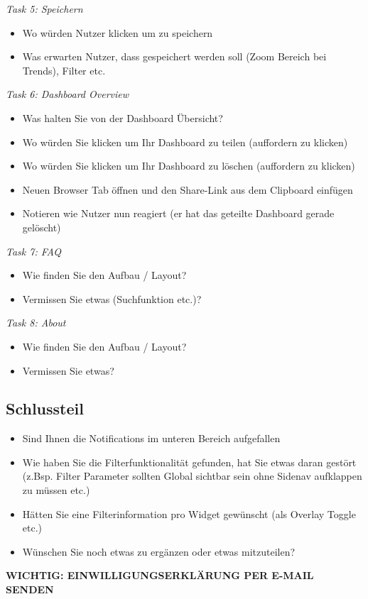 \textit{Task 5: Speichern}
\begin{itemize}
\item Wo würden Nutzer klicken um zu speichern
\item Was erwarten Nutzer, dass gespeichert werden soll (Zoom Bereich bei Trends), Filter etc.
\end{itemize}

\textit{Task 6: Dashboard Overview}
\begin{itemize}
\item Was halten Sie von der Dashboard Übersicht?
\item Wo würden Sie klicken um Ihr Dashboard zu teilen (auffordern zu klicken)
\item Wo würden Sie klicken um Ihr Dashboard zu löschen (auffordern zu klicken)
\item Neuen Browser Tab öffnen und den Share-Link aus dem Clipboard einfügen
\item Notieren wie Nutzer nun reagiert (er hat das geteilte Dashboard gerade gelöscht)
\end{itemize}

\textit{Task 7: FAQ}
\begin{itemize}
\item Wie finden Sie den Aufbau / Layout?
\item Vermissen Sie etwas (Suchfunktion etc.)?
\end{itemize}

\textit{Task 8: About}
\begin{itemize}
\item Wie finden Sie den Aufbau / Layout?
\item Vermissen Sie etwas?
\end{itemize}


\subsection{Schlussteil}
\begin{itemize}
    \item Sind Ihnen die Notifications im unteren Bereich aufgefallen
    \item Wie haben Sie die Filterfunktionalität gefunden, hat Sie etwas daran gestört (z.Bsp. Filter Parameter sollten Global sichtbar sein ohne Sidenav aufklappen zu müssen etc.)
    \item Hätten Sie eine Filterinformation pro Widget gewünscht (als Overlay Toggle etc.)
    \item Wünschen Sie noch etwas zu ergänzen oder etwas mitzuteilen?
\end{itemize}

\textbf{WICHTIG: EINWILLIGUNGSERKLÄRUNG PER E-MAIL SENDEN}